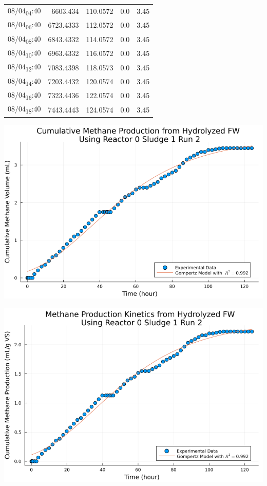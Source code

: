 \documentclass[11pt]{article}
\begin{document}
\begin{center}
\begin{tabular}{lrrrr}
08/04\textsubscript{04}:40 & 6603.434 & 110.0572 & 0.0 & 3.45\\[0pt]
08/04\textsubscript{06}:40 & 6723.4333 & 112.0572 & 0.0 & 3.45\\[0pt]
08/04\textsubscript{08}:40 & 6843.4332 & 114.0572 & 0.0 & 3.45\\[0pt]
08/04\textsubscript{10}:40 & 6963.4332 & 116.0572 & 0.0 & 3.45\\[0pt]
08/04\textsubscript{12}:40 & 7083.4398 & 118.0573 & 0.0 & 3.45\\[0pt]
08/04\textsubscript{14}:40 & 7203.4432 & 120.0574 & 0.0 & 3.45\\[0pt]
08/04\textsubscript{16}:40 & 7323.4436 & 122.0574 & 0.0 & 3.45\\[0pt]
08/04\textsubscript{18}:40 & 7443.4443 & 124.0574 & 0.0 & 3.45\\[0pt]
\end{tabular}
\end{center}

\begin{center}
\includegraphics[width=.9\linewidth]{../plots/BMPs/Hydrolyzed FW/methane_kinetics_hydrolysate_0_s1_r2_hour.png}
\end{center}

\begin{center}
\includegraphics[width=.9\linewidth]{../plots/BMPs/Hydrolyzed FW/specific_methane_kinetics_hydrolysate_0_s1_r2_hour.png}
\end{center}
\end{document}
